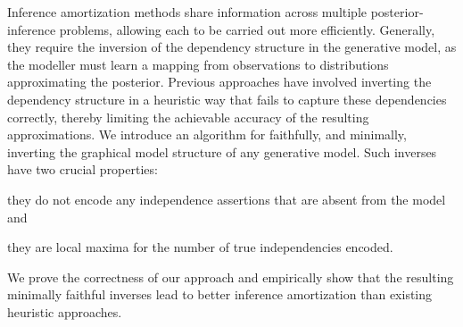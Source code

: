 Inference amortization methods share information across multiple posterior-inference problems, allowing each to be carried out more efficiently.
Generally, they require the inversion of the dependency structure in the generative model, as the modeller must learn a mapping from observations to distributions approximating the posterior.
Previous approaches have involved inverting the dependency structure in a heuristic way that fails to capture these dependencies correctly, thereby limiting the achievable accuracy of the resulting approximations.
We introduce an algorithm for faithfully, and minimally, inverting the graphical model structure of any generative model.
Such inverses have two crucial properties:
\begin{inparaenum}[a)]
\item they do not encode any independence assertions that are absent from the model and
\item they are local maxima for the number of true independencies encoded.
\end{inparaenum}
We prove the correctness of our approach and empirically show that the resulting minimally faithful inverses lead to better inference amortization than existing heuristic approaches.

